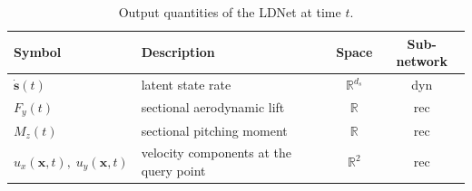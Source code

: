 \begin{table}[t]
    \centering
    \begin{tabular}{|l|l|c|c|}
    \hline
    \rowcolor{bluePoli!40}
    Symbol & Description & Space & Sub-network \T\B \\
    \hline\hline
    $\dot{\mathbf{s}}(t)$ & latent state rate & $\mathbb{R}^{d_s}$ & dyn \T\B \\
    \hline
    $F_y(t)$ & sectional aerodynamic lift & $\mathbb{R}$ & rec \T\B \\
    \hline
    $M_z(t)$ & sectional pitching moment & $\mathbb{R}$ & rec \T\B \\
    \hline
    $u_x(\mathbf{x},t),\;u_y(\mathbf{x},t)$ & velocity components at the query point & $\mathbb{R}^{2}$ & rec \B \\
    \hline
    \end{tabular}
    \\[6pt]
    \caption{Output quantities of the LDNet at time $t$.}
    \label{tab:ldnet_outputs}
\end{table}

